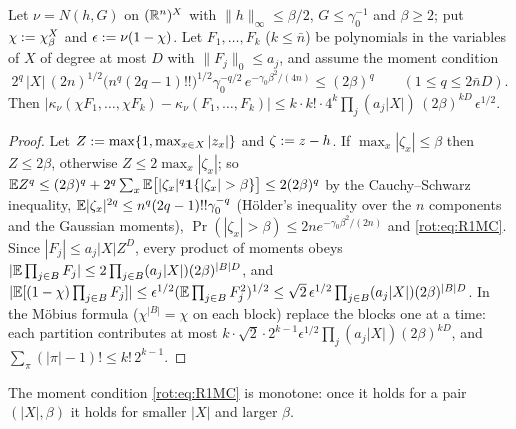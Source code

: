 \begin{lemma}\label{rot:lem:R1chi}
Let $\nu=N(h,G)$ on $(\mathbb R^n)^X$ with $\|h\|_\infty\le\beta/2$, $G\le\gamma_0^{-1}$ and $\beta\ge2$; put $\chi:=\chi^X_\beta$ and $\epsilon:=\nu(1-\chi)$. Let $F_1,\dots,F_k$ ($k\le\bar n$) be polynomials in the variables of $X$ of degree at most $D$ with $\|F_j\|_0\le a_j$, and assume the moment condition
\begin{equation}\label{rot:eq:R1MC}
2^q\,|X|\,(2n)^{1/2}\big(n^q(2q-1)!!\big)^{1/2}\gamma_0^{-q/2}\,e^{-\gamma_0\beta^2/(4n)}\le(2\beta)^q\qquad(1\le q\le2\bar nD).
\end{equation}
Then $|\kappa_\nu(\chi F_1,\dots,\chi F_k)-\kappa_\nu(F_1,\dots,F_k)|\le k\cdot k!\cdot4^k\prod_j(a_j|X|)\,(2\beta)^{kD}\,\epsilon^{1/2}$.
\end{lemma}
\begin{proof}
Let $Z:=\max\{1,\max_{x\in X}|z_x|\}$ and $\zeta:= z-h$. If $\max_x|\zeta_x|\le\beta$ then $Z\le2\beta$, otherwise $Z\le2\max_x|\zeta_x|$; so $\E Z^q\le(2\beta)^q+2^q\sum_x\E\big[|\zeta_x|^q\mathbf 1\{|\zeta_x|>\beta\}\big]\le2(2\beta)^q$ by the Cauchy--Schwarz inequality, $\mathbb E|\zeta_x|^{2q}\le n^q(2q-1)!!\gamma_0^{-q}$ (H\"older's inequality over the $n$ components and the Gaussian moments), $\Pr(|\zeta_x|>\beta)\le2ne^{-\gamma_0\beta^2/(2n)}$ and \eqref{rot:eq:R1MC}. Since $|F_j|\le a_j|X|Z^D$, every product of moments obeys $|\mathbb E\prod_{j\in B}F_j|\le2\prod_{j\in B}(a_j|X|)(2\beta)^{|B|D}$, and $|\mathbb E[(1-\chi)\prod_{j\in B}F_j]|\le\epsilon^{1/2}(\mathbb E\prod_{j\in B}F_j^2)^{1/2}\le\sqrt2\,\epsilon^{1/2}\prod_{j\in B}(a_j|X|)(2\beta)^{|B|D}$. In the M\"obius formula ($\chi^{|B|}=\chi$ on each block) replace the blocks one at a time: each partition contributes at most $k\cdot\sqrt2\cdot2^{k-1}\epsilon^{1/2}\prod_j(a_j|X|)(2\beta)^{kD}$, and $\sum_\pi(|\pi|-1)!\le k!\,2^{k-1}$.
\end{proof}
The moment condition \eqref{rot:eq:R1MC} is monotone: once it holds for a pair $(|X|,\beta)$ it holds for smaller $|X|$ and larger $\beta$.

